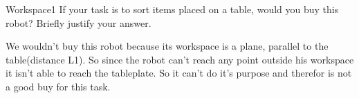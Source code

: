 \begin{questions}

\begin{question}{Workspace}{1}
If your task is to sort items placed on a table, would you buy this robot? Briefly justify your answer.

\begin{answer}
We wouldn't buy this robot because its workspace is a plane, parallel to the table(distance L1). So since the robot can't reach any point outside his workspace it isn't able to reach the tableplate. So it can't do it's purpose and therefor is not a good buy for this task.
\end{answer}

\end{question}

\end{questions}
